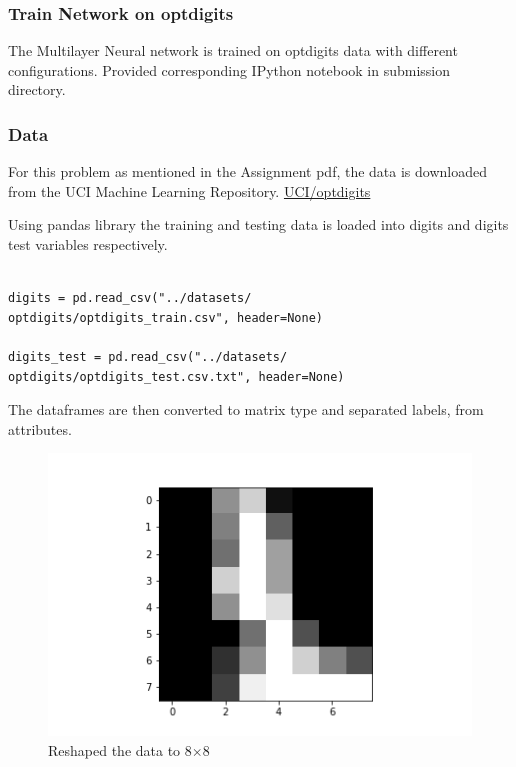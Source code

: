 \documentclass[10pt,a4paper]{article}
\begin{document}
\subsubsection{Train Network on optdigits}
The Multilayer Neural network is trained on optdigits data with different configurations. Provided corresponding IPython notebook in submission directory. 
\subsubsection{Data}
For this problem as mentioned in the Assignment pdf, the data is downloaded from the UCI Machine Learning Repository. \href{http://archive.ics.uci.edu/ml/machinelearning-databases/optdigits/}{UCI/optdigits}

Using pandas library the training and testing data is loaded into digits and digits test variables respectively.

\lstset{%
basicstyle=\small, %
identifierstyle=, %
stringstyle=\ttfamily, %
showstringspaces=false} %

\lstset{language=Python}          %

\begin{lstlisting}[label=loaddata,caption=Importing the data]  % Start your code-block

digits = pd.read_csv("../datasets/
optdigits/optdigits_train.csv", header=None)

digits_test = pd.read_csv("../datasets/
optdigits/optdigits_test.csv.txt", header=None)

\end{lstlisting}


The dataframes are then converted to matrix type and separated labels, from attributes. 
\graphicspath{ {/images/} }
\begin{figure}[!h]
\includegraphics[scale=0.75]{images/P1/GrayImage.png}
  \caption{Reshaped the data to 8$\times$8}
  \label{fig:grayim}
\end{figure}
\end{document}
